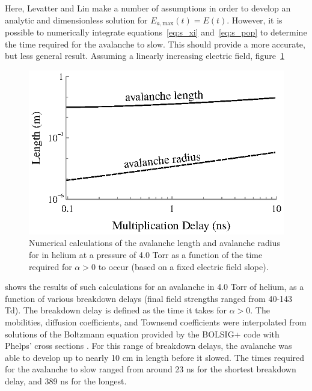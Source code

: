 Here, Levatter and Lin make a number of assumptions in order to develop an
analytic and dimensionless solution for $E_{a,\mathrm{max}}(t) = E(t)$. However,
it is possible to numerically integrate equations~\ref{eq:s_xi}
and~\ref{eq:s_pop} to determine the time required for the avalanche to slow.
This should provide a more accurate, but less general result. Assuming a
linearly increasing electric field, figure~\ref{fig:avalanche_lengths}
\begin{figure}
  \centering
  \includegraphics{./chapters/theory/figures/avalanche_lengths.eps}
  \caption{Numerical calculations of the avalanche length and avalanche radius for
    in helium at a pressure of 4.0 Torr as a function of the time required for
    $\alpha > 0$ to occur (based on a fixed electric field slope).}
  \label{fig:avalanche_lengths}
\end{figure}
shows the results of such calculations for an avalanche in 4.0 Torr of helium,
as a function of various breakdown delays (final field strengths ranged from
40-143 Td). The breakdown delay is defined as the time it takes for $\alpha >
0$. The mobilities, diffusion coefficients, and Townsend coefficients were
interpolated from solutions of the Boltzmann equation provided by the BOLSIG+
code with Phelps' cross sections \cite{Phelps2002}. For this range of breakdown
delays, the avalanche was able to develop up to nearly 10 cm in length before it
slowed. The times required for the avalanche to slow ranged from around 23 ns
for the shortest breakdown delay, and 389 ns for the longest.

